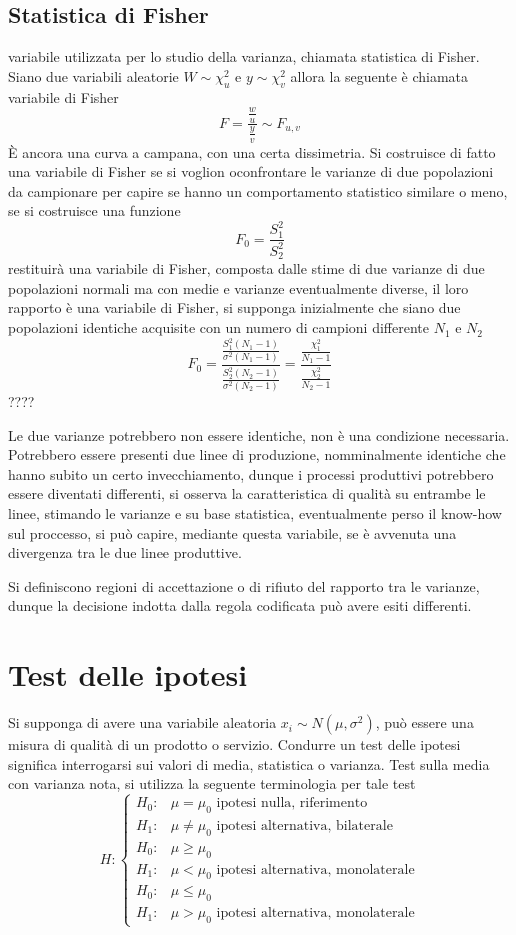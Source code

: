 
\subsection{Statistica di Fisher}
variabile utilizzata per lo studio della varianza, chiamata statistica di Fisher.
Siano due variabili aleatorie $W\sim \chi^2_u$  e $y\sim\chi^2_v$
allora la seguente è chiamata variabile di Fisher
$$
F = \frac{\frac{w}{u}}{\frac{y}{v}} \sim F_{u,v}
$$
È ancora una curva a campana, con una certa dissimetria. Si costruisce di fatto una variabile di Fisher se si voglion oconfrontare le varianze di due popolazioni da campionare per capire se hanno un comportamento statistico similare o meno, se si costruisce una funzione 
$$
F_0 = \frac{S_1^2}{S_2^2}
$$
restituirà una variabile di Fisher, composta dalle stime di due varianze di due 
popolazioni normali ma con medie e varianze eventualmente diverse, il loro 
rapporto è una variabile di Fisher, si supponga inizialmente che siano due popolazioni identiche acquisite con un numero di campioni differente $N_1$ e $N_2$
$$
F_0 = \frac{\frac{S_1^2(N_1-1)}{\sigma^2(N_1-1)}}{\frac{S_2^2(N_2-1)}{\sigma^2(N_2-1)}} = \frac{\frac{\chi_1^2}{N_1-1}}{\frac{\chi_2^2}{N_2-1}}
$$
????

Le due varianze potrebbero non essere identiche, non è una condizione 
necessaria.
Potrebbero essere presenti due linee di produzione, nomminalmente identiche che 
hanno subito un certo invecchiamento, dunque i processi produttivi potrebbero 
essere diventati differenti, si osserva la caratteristica di qualità su 
entrambe le linee, stimando le varianze e su base statistica, eventualmente 
perso il know-how sul proccesso, si può capire, mediante questa variabile, se è 
avvenuta una divergenza tra le due linee produttive.

Si definiscono regioni di accettazione o di rifiuto del rapporto tra le varianze, dunque la decisione indotta dalla regola codificata può avere esiti differenti.

\newpage
\section{Test delle ipotesi}
Si supponga di avere una variabile aleatoria $x_i\sim N(\mu,\sigma^2)$, può essere una misura di qualità di un prodotto o servizio.
Condurre un test delle ipotesi significa interrogarsi sui valori di media, statistica o varianza.
Test sulla media con varianza nota, si utilizza la seguente terminologia per tale test
$$
H :  \begin{cases}
    H_0: &\mu = \mu_0 \text{\ ipotesi nulla, riferimento}\\
    H_1: &\mu \neq \mu_0 \text{\ ipotesi alternativa, bilaterale}\\
    H_0: &\mu \geq \mu_0 \\
    H_1: &\mu < \mu_0 \text{\ ipotesi alternativa, monolaterale} \\
    H_0: &\mu \leq \mu_0 \\
    H_1: &\mu > \mu_0 \text{\ ipotesi alternativa, monolaterale} 
\end{cases}
$$

